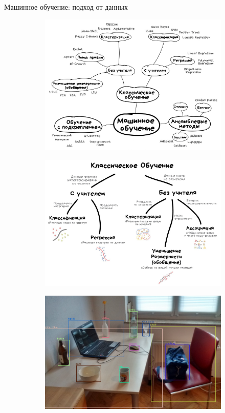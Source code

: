\documentclass[aspectratio=169]{beamer}
\begin{document}
\begin{frame}{Машинное обучение: подход от данных}
\begin{figure}
\begin{subfigure}[b]{0.1\linewidth}
            \includegraphics[width=\linewidth]{graphs/fig31.jpg}
        \end{subfigure}
        \begin{subfigure}[b]{0.1\linewidth}
            \includegraphics[width=\linewidth]{graphs/fig32.jpg}
        \end{subfigure}
        \begin{subfigure}[b]{0.1\linewidth}
            \includegraphics[width=\linewidth]{graphs/fig34.jpg}

\end{subfigure}
\end{figure}
\end{frame}
\end{document}
